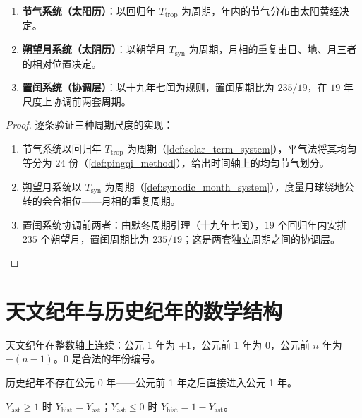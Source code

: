 \begin{theorem}[阴阳合历的三种周期尺度]\label{thm:lunisolar_grammar_unity}
\begin{enumerate}[label=(\roman*)]
    \item \textbf{节气系统（太阳历）}：以回归年 \(T_{\text{trop}}\) 为周期，年内的节气分布由太阳黄经决定。
    \item \textbf{朔望月系统（太阴历）}：以朔望月 \(T_{\text{syn}}\) 为周期，月相的重复由日、地、月三者的相对位置决定。
    \item \textbf{置闰系统（协调层）}：以十九年七闰为规则，置闰周期比为 \(235/19\)，在 \(19\) 年尺度上协调前两套周期。
\end{enumerate}
\end{theorem}

\begin{proof}
逐条验证三种周期尺度的实现：
\begin{enumerate}[label=(\roman*)]
\item 节气系统以回归年 \(T_{\text{trop}}\) 为周期（\cref{def:solar_term_system}），平气法将其均匀等分为 \(24\) 份（\cref{def:pingqi_method}），给出时间轴上的均匀节气划分。
\item 朔望月系统以 \(T_{\text{syn}}\) 为周期（\cref{def:synodic_month_system}），度量月球绕地公转的会合相位——月相的重复周期。
\item 置闰系统协调前两者：由默冬周期引理（十九年七闰），\(19\) 个回归年内安排 \(235\) 个朔望月，置闰周期比为 \(235/19\)；这是两套独立周期之间的协调层。
\end{enumerate}
\end{proof}

\section{天文纪年与历史纪年的数学结构}
\label{sec:calendar_year_numbering}

\begin{definition}[天文纪年]\label{def:astronomical_year_numbering}
天文纪年在整数轴上连续：公元 1 年为 \(+1\)，公元前 1 年为 \(0\)，公元前 \(n\) 年为 \(-(n-1)\)。\(0\) 是合法的年份编号。
\end{definition}

\begin{definition}[历史纪年]\label{def:historical_year_numbering}
历史纪年不存在公元 0 年——公元前 1 年之后直接进入公元 1 年。
\end{definition}

\begin{proposition}[天文纪年与历史纪年的转换]\label{prop:year_conversion}
\(Y_{\text{ast}}\ge 1\) 时 \(Y_{\text{hist}}=Y_{\text{ast}}\)；\(Y_{\text{ast}}\le 0\) 时 \(Y_{\text{hist}}=1-Y_{\text{ast}}\)。
\end{proposition}

